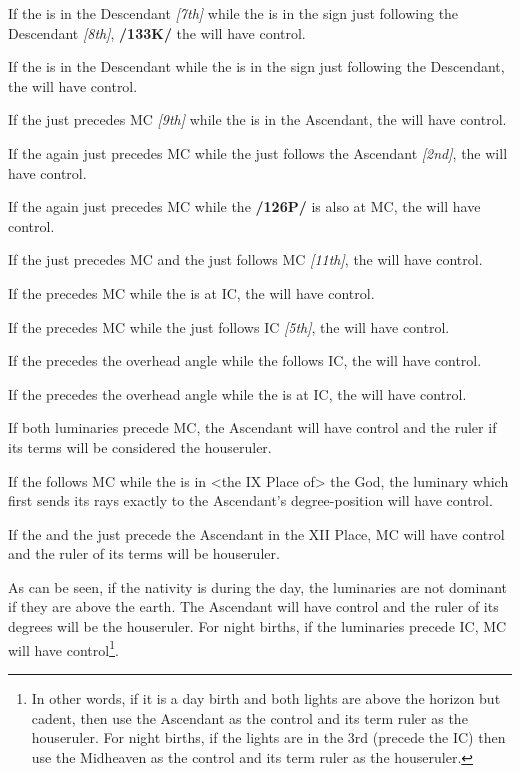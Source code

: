 If the \Sun\xspace is in the Descendant \textsl{[7th]} while the \Moon\xspace is in the sign just following the Descendant \textsl{[8th]}, \textbf{/133K/} the \Sun\xspace will have control. 

If the \Moon\xspace is in the Descendant while the \Sun\xspace is in the sign just following the Descendant, the \Sun\xspace will have control. 

If the \Sun\xspace just precedes MC \textsl{[9th]} while the \Moon\xspace is in the Ascendant, the \Moon\xspace will have control. 

If the \Sun\xspace again just precedes MC while the \Moon\xspace just follows the Ascendant \textsl{[2nd]}, the \Moon\xspace will have control. 

If the \Sun\xspace again just precedes MC while the \Moon\xspace \textbf{/126P/} is also at MC, the \Moon\xspace will have control. 

If the \Sun\xspace just precedes MC and the \Moon\xspace just follows MC \textsl{[11th]}, the \Moon\xspace will have control. 

If the \Moon\xspace precedes MC while the \Sun\xspace is at IC, the \Sun\xspace will have control. 

If the \Moon\xspace precedes MC while the \Sun\xspace just follows IC \textsl{[5th]}, the \Sun\xspace will have control. 

If the \Sun\xspace precedes the overhead angle while the \Moon\xspace follows IC, the \Moon\xspace will have control. 

If the \Sun\xspace precedes the overhead angle while the \Moon\xspace is at IC, the \Moon\xspace will have control. 

If both luminaries precede MC, the Ascendant will have control and the ruler if its terms will be considered the houseruler. 

If the \Moon\xspace follows MC while the \Sun\xspace is in <the IX Place of> the God, the luminary which first sends its rays exactly to the Ascendant’s degree-position will have control. 

If the \Sun\xspace and the \Moon\xspace just precede the Ascendant in the XII Place, MC will have control and the ruler of its terms will be houseruler.

As can be seen, if the nativity is during the day, the luminaries are not dominant if they are above the earth. The Ascendant will have control and the ruler of its degrees will be the houseruler. For night births, if the luminaries precede IC, MC will have control\footnote{In other words, if it is a day birth and both lights are above the horizon but cadent, then use the Ascendant as the control and its term ruler as the houseruler. For night births, if the lights are in the 3rd (precede the IC) then use the Midheaven as the control and its term ruler as the houseruler.}.

